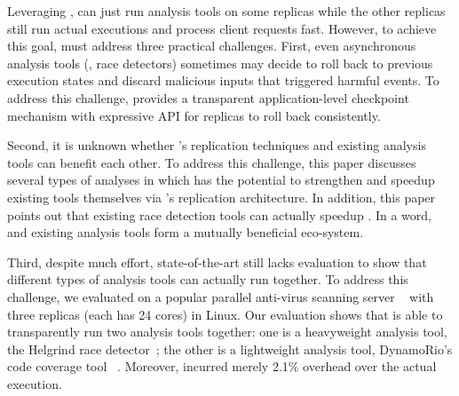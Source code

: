


Leveraging \repbox, \xxx can just run analysis tools on some replicas while the other replicas 
still run actual executions and process client requests fast. However, to achieve this goal, 
\xxx must address three practical challenges. First, even asynchronous analysis tools (\eg, race detectors) 
sometimes may decide to roll back to previous execution states and discard 
malicious inputs that triggered harmful events. To address this challenge, 
\xxx provides a transparent application-level checkpoint mechanism 
with expressive API for replicas to roll back consistently.

Second, it is unknown whether \xxx's replication techniques and existing analysis tools can benefit 
each other. To address this challenge, this paper discusses several types of 
analyses in which \xxx has the potential to strengthen and speedup existing 
tools themselves via \xxx's replication architecture. In addition, 
this paper points out that existing race detection tools can actually speedup 
\xxx. In a word, \xxx and existing analysis tools form a mutually beneficial 
eco-system.

Third, despite much effort, state-of-the-art still lacks evaluation to show that different types of 
analysis tools can actually run together. To address this challenge, we 
evaluated \xxx on a popular parallel anti-virus 
scanning server \clamav~\cite{clamav} with three 
replicas (each has 24 cores) in Linux. Our evaluation shows that \xxx is able to transparently run two 
analysis tools together: one is a heavyweight analysis tool, the Helgrind race 
detector~\cite{valgrind:pldi}; the other is a lightweight analysis tool, 
DynamoRio's code coverage tool \drcov~\cite{dynamorio}. Moreover, \xxx incurred 
merely 2.1\% overhead over the actual execution.


